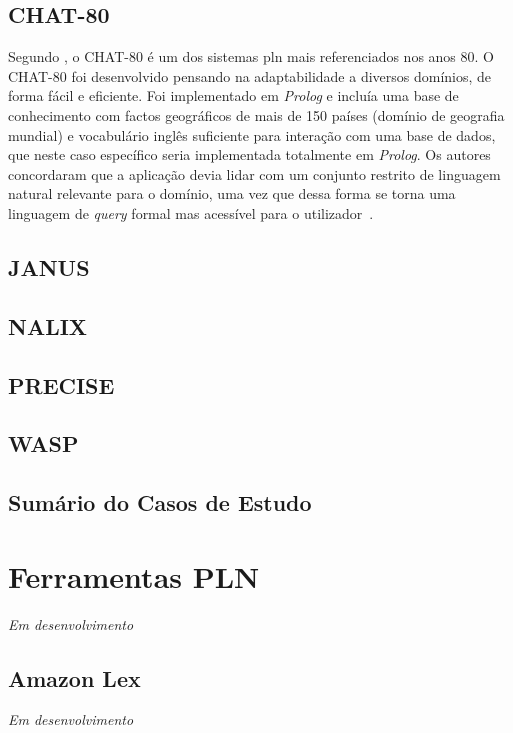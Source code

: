 \subsection{CHAT-80}

Segundo \textcite{nlidb_brief_review}, o CHAT-80 é um dos sistemas \gls{pln} mais referenciados nos anos 80. O CHAT-80 foi desenvolvido pensando na adaptabilidade a diversos domínios, de forma fácil e eficiente. Foi implementado em \textit{Prolog} e incluía uma base de conhecimento com factos geográficos de mais de 150 países (domínio de geografia mundial) e vocabulário inglês suficiente para interação com uma base de dados, que neste caso específico seria implementada totalmente em \textit{Prolog}. Os autores concordaram que a aplicação devia lidar com um conjunto restrito de linguagem natural relevante para o domínio, uma vez que dessa forma se torna uma linguagem de \textit{query} formal mas acessível para o utilizador~\parencite{efficient_easily_adaptable_system_interpreting_nlq}.

\subsection{JANUS}

\subsection{NALIX}

\subsection{PRECISE}

\subsection{WASP}

\subsection{Sumário do Casos de Estudo}

\section{Ferramentas PLN}
\label{sec:chap3_existingtools}

\textit{Em desenvolvimento}

\subsection{Amazon Lex}
\textit{Em desenvolvimento}

